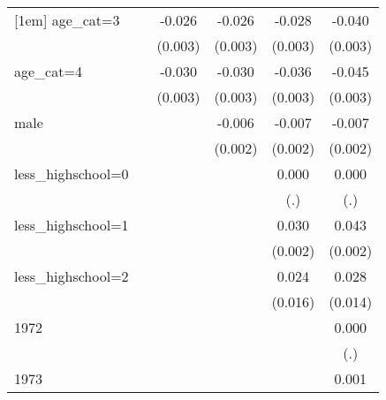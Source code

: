 {\begin{tabular}{l*{5}{c}}
[1em]
age\_cat=3           &                     &      -0.026\sym{***}&      -0.026\sym{***}&      -0.028\sym{***}&      -0.040\sym{***}\\
                    &                     &     (0.003)         &     (0.003)         &     (0.003)         &     (0.003)         \\
[1em]
age\_cat=4           &                     &      -0.030\sym{***}&      -0.030\sym{***}&      -0.036\sym{***}&      -0.045\sym{***}\\
                    &                     &     (0.003)         &     (0.003)         &     (0.003)         &     (0.003)         \\
[1em]
male                &                     &                     &      -0.006\sym{**} &      -0.007\sym{***}&      -0.007\sym{***}\\
                    &                     &                     &     (0.002)         &     (0.002)         &     (0.002)         \\
[1em]
less\_highschool=0   &                     &                     &                     &       0.000         &       0.000         \\
                    &                     &                     &                     &         (.)         &         (.)         \\
[1em]
less\_highschool=1   &                     &                     &                     &       0.030\sym{***}&       0.043\sym{***}\\
                    &                     &                     &                     &     (0.002)         &     (0.002)         \\
[1em]
less\_highschool=2   &                     &                     &                     &       0.024         &       0.028\sym{*}  \\
                    &                     &                     &                     &     (0.016)         &     (0.014)         \\
[1em]
1972                &                     &                     &                     &                     &       0.000         \\
                    &                     &                     &                     &                     &         (.)         \\
[1em]
1973                &                     &                     &                     &                     &       0.001         \\

\end{tabular}}

